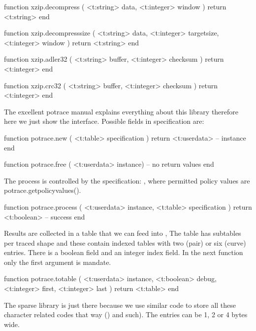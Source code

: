 function xzip.decompress (
    <t:string>  data,
    <t:integer> window
)
    return <t:string>
end

function xzip.decompresssize (
    <t:string>  data,
    <t:integer> targetsize,
    <t:integer> window
)
    return <t:string>
end

function xzip.adler32 (
    <t:string>  buffer,
    <t:integer> checksum
)
    return <t:integer>
end

function xzip.crc32 (
    <t:string>  buffer,
    <t:integer> checksum
)
    return <t:integer>
end
\stoptyping

\stopsubsection

\startsubsection[title=Potrace]

The excellent potrace manual explains everything about this library therefore
here we just show the interface. Possible fields in specification are:

\starttyping[option=LUA]
function potrace.new ( <t:table> specification )
    return <t:userdata> -- instance
end
\stoptyping


\starttyping[option=LUA]
function potrace.free ( <t:userdata> instance)
    -- no return values
end
\stoptyping

The process is controlled by the specification: , where permitted policy values are \showenginekeylist
{potrace.getpolicyvalues()}.

\starttyping[option=LUA]
function potrace.process ( <t:userdata> instance, <t:table> specification )
    return <t:boolean> -- success
end
\stoptyping

Results are collected in a table that we can feed into \METAPOST, The table has
subtables per traced shape and these contain indexed tables with two (pair) or
six (curve) entries. There is a boolean  field and an integer \type
{index} field. In the next function only the first argument is mandate.

\starttyping[option=LUA]
function potrace.totable  (
    <t:userdata> instance,
    <t:boolean>  debug,
    <t:integer>  first,
    <t:integer>  last
)
    return <t:table>
end
\stoptyping

\stopsubsection

\startsubsection[title=Sparse hashes]

The sparse library is just there because we use similar code to store all these
character related codes that way (\type {\lccode}) and such). The entries can be
1, 2 or 4 bytes wide.

